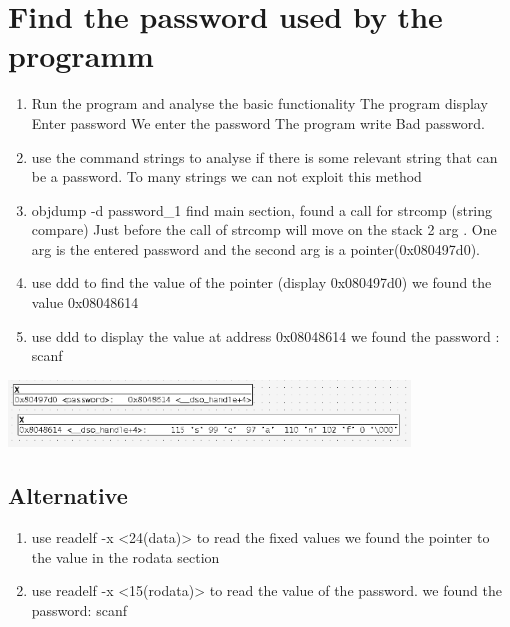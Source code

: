 \documentclass[a4paper,10pt]{article}
\begin{document}
	
	
	
	
	\section{ Find the password used by the programm}
		\begin{enumerate}
		\item Run the program and analyse the basic functionality
		\subitem The program display Enter password 
		\subitem We enter the password
		\subitem The program write Bad password. 
		\item use the command strings to analyse if there is some relevant string that can be a password. 
		\subitem To many strings we can not exploit this method
		\item objdump -d password\_1
		\subitem find main section, found a call for strcomp (string compare)
		\subitem Just before the call of strcomp will move on the stack 2 arg .
		\subitem One arg is the entered password and the second arg is a pointer(0x080497d0).
		\item use ddd to find the value of the pointer (display 0x080497d0)
		\subitem we found the value 0x08048614
		\item use ddd to display the value at address 0x08048614
		\subitem we found the password : scanf
		\end{enumerate}
			\begin{center}
						 \includegraphics[width=0.8\textwidth]{./images/withDebug}
				\end{center}
		\subsection{Alternative}
		\begin{enumerate}
			\item use readelf -x <24(data)> to read the fixed values
			\subitem we found the pointer to the value in the rodata section
			\item use readelf -x <15(rodata)> to read the value of the password.
			\subitem we found the password: scanf
		\end{enumerate}
		
\end{document}
